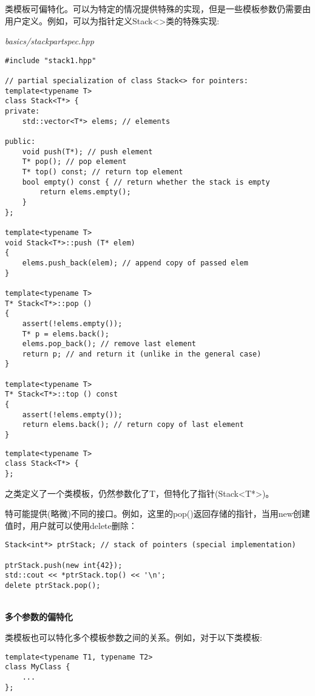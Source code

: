 类模板可偏特化。可以为特定的情况提供特殊的实现，但是一些模板参数仍需要由用户定义。例如，可以为指针定义Stack<>类的特殊实现:

\noindent
\textit{basics/stackpartspec.hpp}
\begin{lstlisting}[style=styleCXX]
#include "stack1.hpp"

// partial specialization of class Stack<> for pointers:
template<typename T>
class Stack<T*> {
private:
	std::vector<T*> elems; // elements
	
public:
	void push(T*); // push element
	T* pop(); // pop element
	T* top() const; // return top element
	bool empty() const { // return whether the stack is empty
		return elems.empty();
	}
};

template<typename T>
void Stack<T*>::push (T* elem)
{
	elems.push_back(elem); // append copy of passed elem
}

template<typename T>
T* Stack<T*>::pop ()
{
	assert(!elems.empty());
	T* p = elems.back();
	elems.pop_back(); // remove last element
	return p; // and return it (unlike in the general case)
}

template<typename T>
T* Stack<T*>::top () const
{
	assert(!elems.empty());
	return elems.back(); // return copy of last element
}
\end{lstlisting}

\begin{lstlisting}[style=styleCXX]
template<typename T>
class Stack<T*> {
};
\end{lstlisting}

之类定义了一个类模板，仍然参数化了T，但特化了指针(Stack<T*>)。

特可能提供(略微)不同的接口。例如，这里的pop()返回存储的指针，当用new创建值时，用户就可以使用delete删除：

\begin{lstlisting}[style=styleCXX]
Stack<int*> ptrStack; // stack of pointers (special implementation)

ptrStack.push(new int{42});
std::cout << *ptrStack.top() << '\n';
delete ptrStack.pop();
\end{lstlisting}

\hspace*{\fill} \\ %
\noindent
\textbf{多个参数的偏特化}

类模板也可以特化多个模板参数之间的关系。例如，对于以下类模板:

\begin{lstlisting}[style=styleCXX]
template<typename T1, typename T2>
class MyClass {
	...
};
\end{lstlisting}

